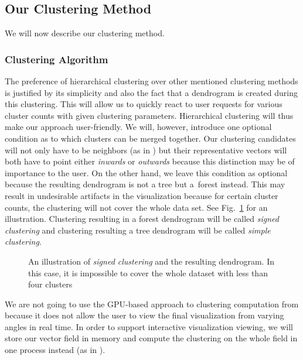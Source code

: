 \subsection{Our Clustering Method}
\label{subsec:analysis-field_clustering-our_method}

We will now describe our clustering method.

\subsubsection{Clustering Algorithm}

The preference of hierarchical clustering over other mentioned clustering methods is justified by its simplicity and also the fact that a dendrogram is created during this clustering. This will allow us to quickly react to user requests for various cluster counts with given clustering parameters. Hierarchical clustering will thus make our approach user-friendly. We will, however, introduce one optional condition as to which clusters can be merged together. Our clustering candidates will not only have to be neighbors (as in \citet{Telea99}) but their representative vectors will both have to point either {\it inwards} or {\it outwards} because this distinction may be of importance to the user. On the other hand, we leave this condition as optional because the resulting dendrogram is not a tree but a~forest instead. This may result in undesirable artifacts in the visualization because for certain cluster counts, the clustering will not cover the whole data set. See Fig.~\ref{fig:illustration-forest_dendrogram} for an illustration. Clustering resulting in a forest dendrogram will be called {\it signed clustering} and clustering resulting a tree dendrogram will be called {\it simple clustering}.

\begin{figure}[h]
\centering
\def\svgwidth{\textwidth}

\caption[Forest dendrogram]{An illustration of {\it signed clustering} and the resulting dendrogram. In this case, it is impossible to cover the whole dataset with less than four clusters}
\label{fig:illustration-forest_dendrogram}
\end{figure}

We are not going to use the GPU-based approach to clustering computation from \citet{Peng12} because it does not allow the user to view the final visualization from varying angles in real time. In order to support interactive visualization viewing, we will store our vector field in memory and compute the clustering on the whole field in one process instead (as in \citet{Telea99}).

